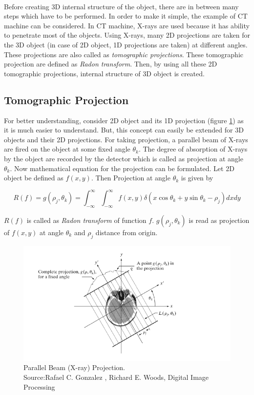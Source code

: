 \documentclass{report}
\begin{document}
\noindent\\
Before creating 3D internal structure of the object, there are in between many steps which have to be performed. In order to make it simple, the example of CT machine can be considered. In CT machine, X-rays are used because it has ability to penetrate most of the objects. Using X-rays, many 2D projections are taken for the 3D object (in case of 2D object, 1D projections are taken) at different angles. These projections are also called as \textit{tomographic projections}. These tomographic projection are defined as \textit{Radon transform}. Then, by using all these 2D tomographic projections,  internal structure of 3D object is created.

\subsection{Tomographic Projection}\label{sec:tomo_pro}
For better understanding, consider 2D object and its 1D projection (figure \ref{fig:parallel_beam}) as it is much easier to understand. But, this concept can easily be extended for 3D objects and their 2D projections. For taking projection, a parallel beam of X-rays are fired on the object at some fixed angle ${\theta_k}$. The degree of absorption of X-rays by the object are recorded by the detector which is called as projection at angle ${\theta_k}$. Now mathematical equation for the projection can be formulated. Let 2D object be defined as $f(x,y)$. Then Projection at angle ${\theta_k}$ is given by

\begin{equation}
R(f) = g(\rho_j,\theta_k) = \int_{-\infty}^{\infty} \int_{-\infty}^{\infty} f(x,y) \delta(x\cos\theta_k+y\sin\theta_k - \rho_j)  dxdy
\label{eq:radon_trasform}
\end{equation}

\noindent
$R(f)$ is called as \textit{Radon transform} of function $f$. $g(\rho_j,\theta_k)$ is read as projection of $f(x,y)$ at angle $\theta_k$ and $\rho_j$ distance from origin.

\begin{figure}[H]
\includegraphics[width=1\textwidth]{parallel_beam}
\centering
\captionsetup{justification=centering}
\caption{ Parallel Beam (X-ray) Projection.\\ Source:Rafael C. Gonzalez , Richard E. Woods, Digital Image Processing}
\label{fig:parallel_beam}
\end{figure}
\end{document}
